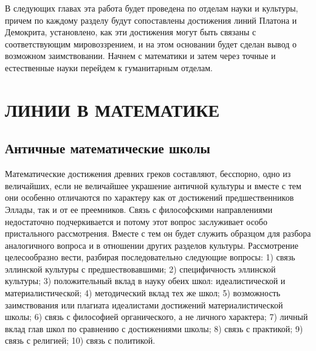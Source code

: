 В следующих главах эта работа будет проведена по отделам науки и
культуры, причем по каждому разделу будут сопоставлены достижения
линий Платона и Демокрита, установлено, как эти достижения могут быть
связаны с соответствующим мировоззрением, и на этом основании будет
сделан вывод о возможном заимствовании. Начнем с математики и затем
через точные и естественные науки перейдем к гуманитарным отделам.

\clearpage

\section{ЛИНИИ В МАТЕМАТИКЕ}

\subsection{Античные математические школы}

Математические достижения древних греков составляют, бесспорно,
одно из величайших, если не величайшее украшение античной культуры и
вместе с тем они особенно отличаются по характеру как от достижений
предшественников Эллады, так и от ее преемников. Связь с философскими
направлениями недостаточно подчеркивается и потому этот вопрос
заслуживает особо пристального рассмотрения. Вместе с тем он будет
служить образцом для разбора аналогичного вопроса и в отношении других
разделов культуры. Рассмотрение целесообразно вести, разбирая
последовательно следующие вопросы: 1) связь эллинской культуры с
предшествовавшими; 2) специфичность эллинской культуры; 3)
положительный вклад в науку обеих школ: идеалистической и
материалистической; 4) методический вклад тех же школ; 5) возможность
заимствования или плагиата идеалистами достижений материалистической
школы; 6) связь с философией органического, а не личного характера; 7)
личный вклад глав школ по сравнению с достижениями школы; 8) связь с
практикой; 9) связь с религией; 10) связь с политикой.

